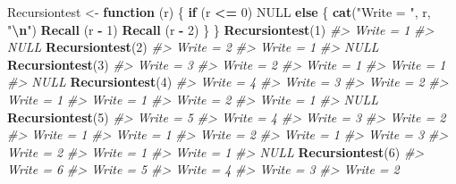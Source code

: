 \documentclass[
]{book}
\newenvironment{Shaded}{\begin{snugshade}}{\end{snugshade}}
\newcommand{\CommentTok}[1]{\textcolor[rgb]{0.56,0.35,0.01}{\textit{#1}}}
\newcommand{\ConstantTok}[1]{\textcolor[rgb]{0.56,0.35,0.01}{#1}}
\newcommand{\ControlFlowTok}[1]{\textcolor[rgb]{0.13,0.29,0.53}{\textbf{#1}}}
\newcommand{\DecValTok}[1]{\textcolor[rgb]{0.00,0.00,0.81}{#1}}
\newcommand{\FunctionTok}[1]{\textcolor[rgb]{0.13,0.29,0.53}{\textbf{#1}}}
\newcommand{\NormalTok}[1]{#1}
\newcommand{\OtherTok}[1]{\textcolor[rgb]{0.56,0.35,0.01}{#1}}
\newcommand{\SpecialCharTok}[1]{\textcolor[rgb]{0.81,0.36,0.00}{\textbf{#1}}}
\newcommand{\StringTok}[1]{\textcolor[rgb]{0.31,0.60,0.02}{#1}}
\begin{document}
\begin{Shaded}
\begin{Highlighting}[]
\NormalTok{Recursiontest }\OtherTok{\textless{}{-}} \ControlFlowTok{function}\NormalTok{ (r)}
\NormalTok{\{ }\ControlFlowTok{if}\NormalTok{ (r }\SpecialCharTok{\textless{}=} \DecValTok{0}\NormalTok{) }\ConstantTok{NULL}
  \ControlFlowTok{else}\NormalTok{ \{ }\FunctionTok{cat}\NormalTok{(}\StringTok{"Write = "}\NormalTok{, r, }\StringTok{"}\SpecialCharTok{\textbackslash{}n}\StringTok{"}\NormalTok{)}
         \FunctionTok{Recall}\NormalTok{ (r }\SpecialCharTok{{-}} \DecValTok{1}\NormalTok{)}
         \FunctionTok{Recall}\NormalTok{ (r }\SpecialCharTok{{-}} \DecValTok{2}\NormalTok{)}
\NormalTok{       \}}
\NormalTok{\}}
\FunctionTok{Recursiontest}\NormalTok{(}\DecValTok{1}\NormalTok{)}
\CommentTok{\#\textgreater{} Write =  1}
\CommentTok{\#\textgreater{} NULL}
\FunctionTok{Recursiontest}\NormalTok{(}\DecValTok{2}\NormalTok{)}
\CommentTok{\#\textgreater{} Write =  2 }
\CommentTok{\#\textgreater{} Write =  1}
\CommentTok{\#\textgreater{} NULL}
\FunctionTok{Recursiontest}\NormalTok{(}\DecValTok{3}\NormalTok{)}
\CommentTok{\#\textgreater{} Write =  3 }
\CommentTok{\#\textgreater{} Write =  2 }
\CommentTok{\#\textgreater{} Write =  1 }
\CommentTok{\#\textgreater{} Write =  1}
\CommentTok{\#\textgreater{} NULL}
\FunctionTok{Recursiontest}\NormalTok{(}\DecValTok{4}\NormalTok{)}
\CommentTok{\#\textgreater{} Write =  4 }
\CommentTok{\#\textgreater{} Write =  3 }
\CommentTok{\#\textgreater{} Write =  2 }
\CommentTok{\#\textgreater{} Write =  1 }
\CommentTok{\#\textgreater{} Write =  1 }
\CommentTok{\#\textgreater{} Write =  2 }
\CommentTok{\#\textgreater{} Write =  1}
\CommentTok{\#\textgreater{} NULL}
\FunctionTok{Recursiontest}\NormalTok{(}\DecValTok{5}\NormalTok{)}
\CommentTok{\#\textgreater{} Write =  5 }
\CommentTok{\#\textgreater{} Write =  4 }
\CommentTok{\#\textgreater{} Write =  3 }
\CommentTok{\#\textgreater{} Write =  2 }
\CommentTok{\#\textgreater{} Write =  1 }
\CommentTok{\#\textgreater{} Write =  1 }
\CommentTok{\#\textgreater{} Write =  2 }
\CommentTok{\#\textgreater{} Write =  1 }
\CommentTok{\#\textgreater{} Write =  3 }
\CommentTok{\#\textgreater{} Write =  2 }
\CommentTok{\#\textgreater{} Write =  1 }
\CommentTok{\#\textgreater{} Write =  1}
\CommentTok{\#\textgreater{} NULL}
\FunctionTok{Recursiontest}\NormalTok{(}\DecValTok{6}\NormalTok{)}
\CommentTok{\#\textgreater{} Write =  6 }
\CommentTok{\#\textgreater{} Write =  5 }
\CommentTok{\#\textgreater{} Write =  4 }
\CommentTok{\#\textgreater{} Write =  3 }
\CommentTok{\#\textgreater{} Write =  2 }

\end{Highlighting}
\end{Shaded}
\end{document}
